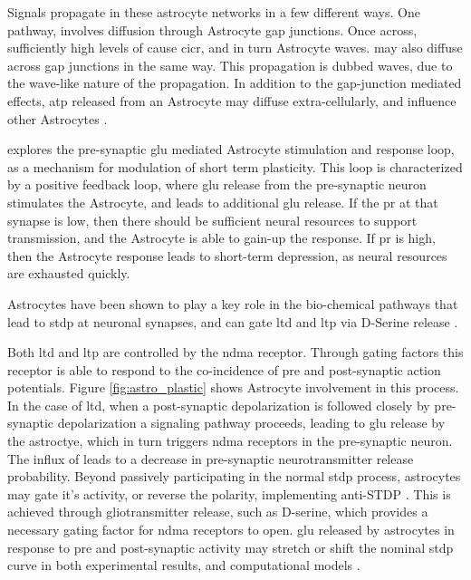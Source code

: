     Signals propagate in these astrocyte networks in a few different
    ways. One pathway, involves \ipt diffusion through Astrocyte gap
    junctions. Once across, sufficiently high levels of \ipt cause
    \Gls{cicr}, and in turn Astrocyte waves. \ca may also diffuse across gap
    junctions in the same way. This propagation is dubbed \ca waves, due to
    the wave-like nature of the propagation. In addition to the gap-junction
    mediated effects, \gls{atp} released from an Astrocyte may diffuse
    extra-cellularly, and influence other Astrocytes \parencite{amiri_2013}.
    
    \parencite{pitta_2012} explores the pre-synaptic \Gls{glu} mediated Astrocyte
    stimulation and response loop, as a mechanism for modulation of short term
    plasticity. This loop is characterized by a positive feedback loop, where
    \Gls{glu} release from the pre-synaptic neuron stimulates the Astrocyte, and
    leads to additional \Gls{glu} release. If the \acrshort{pr} at that synapse
    is low, then there should be sufficient neural resources to support
    transmission, and the Astrocyte is able to gain-up the response. If
    \acrshort{pr} is high, then the Astrocyte response leads to short-term
    depression, as neural resources are exhausted quickly.

    Astrocytes have been shown to play a key role in the bio-chemical pathways
    that lead to \Gls{stdp} at neuronal synapses, and can gate \Gls{ltd} and \Gls{ltp} via D-Serine
    release \parencite{manninen_2019}.

    Both \Gls{ltd} and \Gls{ltp} are controlled by the \Gls{ndma}
    receptor. Through gating factors this receptor is able to respond to the
    co-incidence of pre and post-synaptic action potentials. Figure
    \ref{fig:astro_plastic} shows Astrocyte involvement in this process. In the
    case of \Gls{ltd}, when a post-synaptic depolarization is followed closely
    by pre-synaptic depolarization a signaling pathway proceeds, leading to
    \Gls{glu} release by the astroctye, which in turn triggers \Gls{ndma}
    receptors in the pre-synaptic neuron. The influx of \ca leads to a decrease
    in pre-synaptic neurotransmitter release probability. Beyond passively
    participating in the normal \Gls{stdp} process, astrocytes may gate it's
    activity, or reverse the polarity, implementing anti-STDP
    \parencite{min_2012}. This is achieved through gliotransmitter release, such as
    D-serine, which provides a necessary gating factor for \Gls{ndma} receptors
    to open. \Gls{glu} released by astrocytes in response to pre and
    post-synaptic activity may stretch or shift the nominal \Gls{stdp} curve
    in both experimental results, and computational models \parencite{pitta_2016}.

